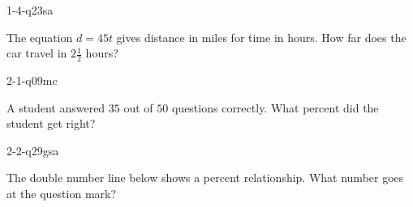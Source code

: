 
\begin{practiceQuestion}{1-4-q23}{sa}
\begin{questionText}
The equation $d = 45t$ gives distance in miles for time in hours. How far does the car travel in $2\frac{1}{2}$ hours?
\end{questionText}
\end{practiceQuestion}

\begin{practiceQuestion}{2-1-q09}{mc}
\begin{questionText}
A student answered $35$ out of $50$ questions correctly. What percent did the student get right?
\end{questionText}
\end{practiceQuestion}

\begin{practiceQuestion}{2-2-q29}{gsa}
\begin{questionText}
The double number line below shows a percent relationship. What number goes at the question mark?

\begin{center}
\end{center}
\end{questionText}
\end{practiceQuestion}

